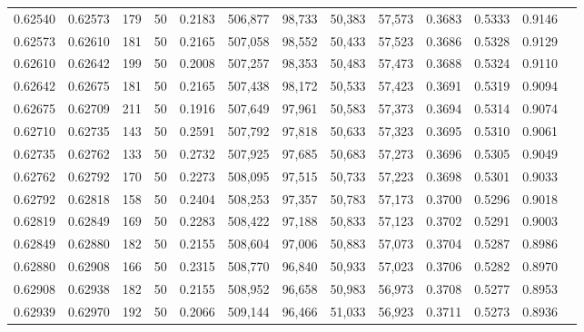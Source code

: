 \begin{tabular}{rrrrrrrrrrrrr}
0.62540 & 0.62573 &   179 &  50 &                                     0.2183 & 506,877 &  98,733 &  50,383 &  57,573 & 0.3683 & 0.5333 & 0.9146 \\
0.62573 & 0.62610 &   181 &  50 &                                     0.2165 & 507,058 &  98,552 &  50,433 &  57,523 & 0.3686 & 0.5328 & 0.9129 \\
0.62610 & 0.62642 &   199 &  50 &                                     0.2008 & 507,257 &  98,353 &  50,483 &  57,473 & 0.3688 & 0.5324 & 0.9110 \\
0.62642 & 0.62675 &   181 &  50 &                                     0.2165 & 507,438 &  98,172 &  50,533 &  57,423 & 0.3691 & 0.5319 & 0.9094 \\
0.62675 & 0.62709 &   211 &  50 &                                     0.1916 & 507,649 &  97,961 &  50,583 &  57,373 & 0.3694 & 0.5314 & 0.9074 \\
0.62710 & 0.62735 &   143 &  50 &                                     0.2591 & 507,792 &  97,818 &  50,633 &  57,323 & 0.3695 & 0.5310 & 0.9061 \\
0.62735 & 0.62762 &   133 &  50 &                                     0.2732 & 507,925 &  97,685 &  50,683 &  57,273 & 0.3696 & 0.5305 & 0.9049 \\
0.62762 & 0.62792 &   170 &  50 &                                     0.2273 & 508,095 &  97,515 &  50,733 &  57,223 & 0.3698 & 0.5301 & 0.9033 \\
0.62792 & 0.62818 &   158 &  50 &                                     0.2404 & 508,253 &  97,357 &  50,783 &  57,173 & 0.3700 & 0.5296 & 0.9018 \\
0.62819 & 0.62849 &   169 &  50 &                                     0.2283 & 508,422 &  97,188 &  50,833 &  57,123 & 0.3702 & 0.5291 & 0.9003 \\
0.62849 & 0.62880 &   182 &  50 &                                     0.2155 & 508,604 &  97,006 &  50,883 &  57,073 & 0.3704 & 0.5287 & 0.8986 \\
0.62880 & 0.62908 &   166 &  50 &                                     0.2315 & 508,770 &  96,840 &  50,933 &  57,023 & 0.3706 & 0.5282 & 0.8970 \\
0.62908 & 0.62938 &   182 &  50 &                                     0.2155 & 508,952 &  96,658 &  50,983 &  56,973 & 0.3708 & 0.5277 & 0.8953 \\
0.62939 & 0.62970 &   192 &  50 &                                     0.2066 & 509,144 &  96,466 &  51,033 &  56,923 & 0.3711 & 0.5273 & 0.8936 \\

\end{tabular}
